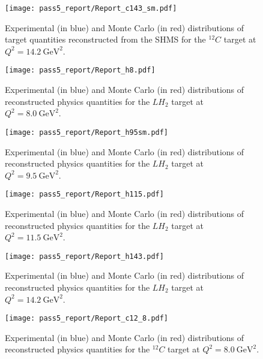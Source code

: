 \begin{figure}[!h]
    \centering
    \texttt{[image: pass5\_report/Report\_c143\_sm.pdf]}
    \caption{
            Experimental (in blue) and Monte Carlo (in red) distributions of
            target quantities reconstructed from the SHMS for
            the ${}^{12}C$ target at $Q^2=\SI{14.2}{\giga\electronvolt\squared}$.
            }
    \label{fig:Report_c143_sm.pdf}
\end{figure}


\begin{figure}[!h]
    \centering
    \texttt{[image: pass5\_report/Report\_h8.pdf]}
    \caption{
            Experimental (in blue) and Monte Carlo (in red) distributions of
            reconstructed physics quantities for
            the $LH_2$ target at $Q^2=\SI{8.0}{\giga\electronvolt\squared}$.
            }
    \label{fig:Report_h8.pdf}
\end{figure}


\begin{figure}[!h]
    \centering
    \texttt{[image: pass5\_report/Report\_h95sm.pdf]}
    \caption{
            Experimental (in blue) and Monte Carlo (in red) distributions of
            reconstructed physics quantities for
            the $LH_2$ target at $Q^2=\SI{9.5}{\giga\electronvolt\squared}$.
            }
    \label{fig:Report_h95sm.pdf}
\end{figure}


\begin{figure}[!h]
    \centering
    \texttt{[image: pass5\_report/Report\_h115.pdf]}
    \caption{
            Experimental (in blue) and Monte Carlo (in red) distributions of
            reconstructed physics quantities for
            the $LH_2$ target at $Q^2=\SI{11.5}{\giga\electronvolt\squared}$.
            }
    \label{fig:Report_h115.pdf}
\end{figure}


\begin{figure}[!h]
    \centering
    \texttt{[image: pass5\_report/Report\_h143.pdf]}
    \caption{
            Experimental (in blue) and Monte Carlo (in red) distributions of
            reconstructed physics quantities for
            the $LH_2$ target at $Q^2=\SI{14.2}{\giga\electronvolt\squared}$.
            }
    \label{fig:Report_h143.pdf}
\end{figure}


\begin{figure}[!h]
    \centering
    \texttt{[image: pass5\_report/Report\_c12\_8.pdf]}
    \caption{
            Experimental (in blue) and Monte Carlo (in red) distributions of
            reconstructed physics quantities for
            the ${}^{12}C$ target at $Q^2=\SI{8.0}{\giga\electronvolt\squared}$.
            }
    \label{fig:Report_c12_8.pdf}
\end{figure}


